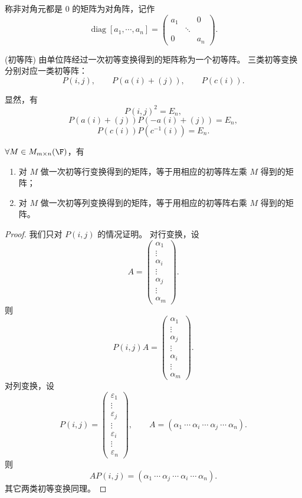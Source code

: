 \begin{definition}\label{p1:concept:c3-l908}
	称非对角元都是 $0$ 的矩阵为对角阵，记作
	\[
	\operatorname{diag}[a_1,\cdots,a_n]=
	\begin{pmatrix}
		a_1&&0\\
		&\ddots&\\
		0&&a_n
	\end{pmatrix}.
	\]
\end{definition}

\begin{definition}(初等阵)\label{3.3.11}\label{p1:concept:c3-l920}
	由单位阵经过一次初等变换得到的矩阵称为一个初等阵。
	三类初等变换分别对应一类初等阵：
	\[
	P(i,j),\qquad P(a(i)+(j)),\qquad P(c(i)).
	\]

\end{definition}
	显然，有
\[
P(i,j)^2=E_n,
\]
\[
P(a(i)+(j))P(-a(i)+(j))=E_n,
\]
\[
P(c(i))P(c^{-1}(i))=E_n.
\]
\begin{theorem}
	$\forall M\in M_{m\times n}(\F)$，有
	\begin{enumerate}
		\item 对 $M$ 做一次初等行变换得到的矩阵，等于用相应的初等阵左乘 $M$ 得到的矩阵；
		\item 对 $M$ 做一次初等列变换得到的矩阵，等于用相应的初等阵右乘 $M$ 得到的矩阵。
	\end{enumerate}
\end{theorem}

\begin{proof}
	我们只对 $P(i,j)$ 的情况证明。
	对行变换，设
	\[
	A=
	\begin{pmatrix}
		\alpha_1\\
		\vdots\\
		\alpha_i\\
		\vdots\\
		\alpha_j\\
		\vdots\\
		\alpha_m
	\end{pmatrix}.
	\]
	则
	\[
	P(i,j)A=
	\begin{pmatrix}
		\alpha_1\\
		\vdots\\
		\alpha_j\\
		\vdots\\
		\alpha_i\\
		\vdots\\
		\alpha_m
	\end{pmatrix}.
	\]
	对列变换，设
	\[
	P(i,j)=
	\begin{pmatrix}
		\varepsilon_1\\
		\vdots\\
		\varepsilon_j\\
		\vdots\\
		\varepsilon_i\\
		\vdots\\
		\varepsilon_n
	\end{pmatrix},
	\qquad
	A=(\alpha_1\ \cdots\ \alpha_i\ \cdots\ \alpha_j\ \cdots\ \alpha_n).
	\]
	则
	\[
	AP(i,j)=(\alpha_1\ \cdots\ \alpha_j\ \cdots\ \alpha_i\ \cdots\ \alpha_n).
	\]
	其它两类初等变换同理。
\end{proof}

